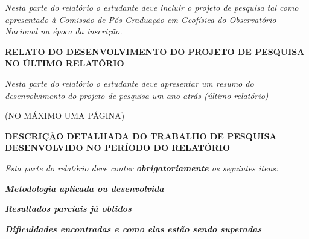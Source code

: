 \documentclass[12pt,a4paper]{article}
\begin{document}
\vspace{1cm}

\textit{
Nesta parte do relatório o estudante deve incluir o projeto de pesquisa tal
como apresentado à Comissão de Pós-Graduação em Geofísica do Observatório
Nacional na época da inscrição.
}

\newpage

\begin{center}
\textbf{\large RELATO DO DESENVOLVIMENTO DO PROJETO DE PESQUISA NO ÚLTIMO
RELATÓRIO}
\end{center}

\vspace{1cm}

\textit{
Nesta parte do relatório o estudante deve apresentar um resumo do
desenvolvimento do projeto de pesquisa um ano atrás (último relatório)
}

\vspace{1cm}

{\centering
(NO MÁXIMO UMA PÁGINA)
\par}

\newpage

\begin{center}
\textbf{\large DESCRIÇÃO DETALHADA DO TRABALHO DE PESQUISA DESENVOLVIDO NO
PERÍODO DO RELATÓRIO}
\end{center}

\vspace{1cm}

\textit{
Esta parte do relatório deve conter \textbf{obrigatoriamente}
os seguintes itens:
}

\vspace{1cm}

{\centering\bfseries\itshape
Metodologia aplicada ou desenvolvida
\par}

\bigskip

{\centering\bfseries\itshape
Resultados parciais já obtidos
\par}

\bigskip

{\centering\bfseries\itshape
Dificuldades encontradas e como elas estão sendo superadas
\par}
\end{document}
